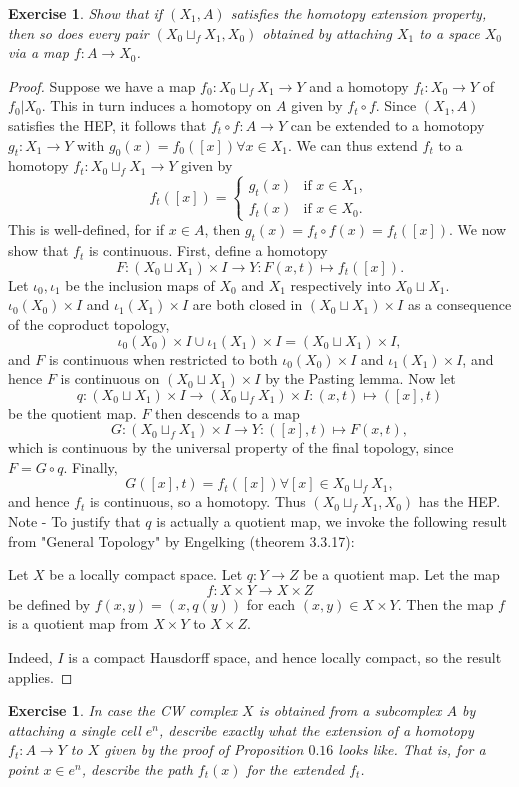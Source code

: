 \documentclass{article}
\newtheorem{exercise}[theorem]{Exercise}
\begin{document}
\begin{exercise}
Show that if $(X_1,A)$ satisfies the homotopy extension property, then so does every pair $(X_0\sqcup_fX_1,X_0)$ obtained by attaching $X_1$ to a space $X_0$ via a map $f:A\to X_0$.
\end{exercise}
\begin{proof}
Suppose we have a map $f_0:X_0\sqcup_fX_1\to Y$ and a homotopy $f_t:X_0\to Y$ of $f_0|X_0$. This in turn induces a homotopy on $A$ given by $f_t\circ f$. Since $(X_1,A)$ satisfies the HEP, it follows that $f_t\circ f:A\to Y$ can be extended to a homotopy $g_t:X_1\to Y$ with $g_0(x)=f_0([x])\forall x\in X_1$. We can thus extend $f_t$ to a homotopy $f_t:X_0\sqcup_fX_1\to Y$ given by \[f_t([x])=\begin{cases}
    g_t(x)&\text{if }x\in X_1,\\
    f_t(x)&\text{if }x\in X_0.
\end{cases}\]This is well-defined, for if $x\in A$, then $g_t(x)=f_t\circ f(x)=f_t([x])$. We now show that $f_t$ is continuous. First, define a homotopy \[F:(X_0\sqcup X_1)\times I\to Y:F(x,t)\mapsto f_t([x]).\] Let $\iota_0,\iota_1$ be the inclusion maps of $X_0$ and $X_1$ respectively into $X_0\sqcup X_1$. $\iota_0(X_0)\times I$ and $\iota_1(X_1)\times I$ are both closed in $(X_0\sqcup X_1)\times I$ as a consequence of the coproduct topology, \[\iota_0(X_0)\times I\cup \iota_1(X_1)\times I=(X_0\sqcup X_1)\times I,\] and $F$ is continuous when restricted to both $\iota_0(X_0)\times I$ and $\iota_1(X_1)\times I$, and hence $F$ is continuous on $(X_0\sqcup X_1)\times I$ by the Pasting lemma. Now let \[q:(X_0\sqcup X_1)\times I\to (X_0\sqcup_fX_1)\times I:(x,t)\mapsto([x],t)\] be the quotient map. $F$ then descends to a map \[G:(X_0\sqcup_fX_1)\times I\to Y:([x],t)\mapsto F(x,t),\] which is continuous by the universal property of the final topology, since $F=G\circ q$. Finally, \[G([x],t)=f_t([x])\forall[x]\in X_0\sqcup_fX_1,\] and hence $f_t$ is continuous, so a homotopy. Thus $(X_0\sqcup_fX_1,X_0)$ has the HEP. 
\newline Note - To justify that $q$ is actually a quotient map, we invoke the following result from "General Topology" by Engelking (theorem 3.3.17):\newline

\noindent Let $X$  be a locally compact space. Let $q:Y\to Z$ be a quotient map. Let the map \[f:X\times Y\to X\times Z\] be defined by $f(x,y)=(x,q(y))$ for each $(x,y)\in X\times Y$. Then the map $f$ is a quotient map from $X\times Y$ to $X\times Z$.

Indeed, $I$ is a compact Hausdorff space, and hence locally compact, so the result applies.
\end{proof}

\begin{exercise}
In case the CW complex $X$ is obtained from a subcomplex $A$ by attaching a single cell $e^n$, describe exactly what the extension of a homotopy $f_t:A\to Y$ to $X$ given by the proof of Proposition $0.16$ looks like. That is, for a point $x\in e^n$, describe the path $f_t(x)$ for the extended $f_t$.
\end{exercise}
\end{document}
